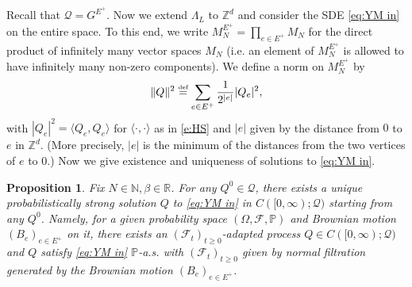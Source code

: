 \documentclass[11pt,UTF-8,reqno]{amsart}
\numberwithin{equation}{section}
\newtheorem{proposition}[theorem]{Proposition}
\def\<{{\langle}}
\def\>{{\rangle}}
\def\dif{{\mathord{{\rm d}}}}
\newcommand{\eqdef}{\stackrel{\mbox{\tiny def}}{=}}
\def\cF{{\mathcal F}}
\def\cQ{{\mathcal Q}}
\def\mN{{\mathbb N}}
\def\mP{{\mathbb P}}
\def\mR{{\mathbb R}}
\def\mZ{{\mathbb Z}}
\def\geq{\geqslant}
\def\<{{\langle}}
\def\>{{\rangle}}
\def\dif{{\mathord{{\rm d}}}}
\def\bp{\begin{proposition}}
\def\ep{\end{proposition}}
\def\geq{\geqslant}
\def\<{\langle} \def\>{\rangle}
\begin{document}
Recall that $\cQ=G^{E^+}$. Now we extend $\Lambda_L$ to $\mZ^d$ and consider the  SDE \eqref{eq:YM in} on the entire space. To this end, we write $M_N^{E^+} = \prod_{e\in E^+} M_N$ for the direct product of infinitely many vector spaces $M_N$
(i.e. an element of $M_N^{E^+}$ is allowed to have infinitely many non-zero components).
We define  a norm  on $M_N^{E^+}$  by
\begin{align}\label{eq:norm}
	\|Q\|^2\eqdef \sum_{e\in E^+}\frac1{2^{|e|}}|Q_e|^2,
\end{align}
with $|Q_e|^2=\<Q_e,Q_e\>$ for $\<\cdot,\cdot\>$ as in \eqref{e:HS}  and $|e|$ given by the distance from $0$ to $e$ in $\mZ^d$.
(More precisely, $|e|$ is the minimum of the distances from the two vertices of $e$ to $0$.) Now we give existence and uniqueness of solutions to \eqref{eq:YM in}. 

\bp\label{lem:4.7}
Fix $N\in\mN, \beta\in\mR$. For any $Q^0\in \cQ$, there exists a unique probabilistically strong solution $Q$ to \eqref{eq:YM in} in $C([0,\infty);\cQ)$ starting from any $Q^0$. Namely, for a given probability space  $(\Omega,\cF, \mP)$ and  Brownian motion $(B_e)_{e\in E^+}$ on it, there exists an $(\cF_t)_{t\geq0}$-adapted process $Q\in C([0,\infty);\cQ)$  and $Q$ satisfy \eqref{eq:YM in} $\mP$-a.s. with $(\cF_t)_{t\geq0}$ given by normal filtration generated by the Brownian motion $(B_e)_{e\in E^+}$.
\ep
\end{document}
